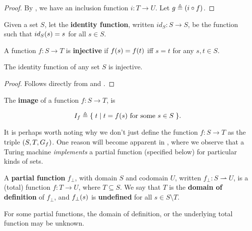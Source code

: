 \begin{proof} By , we have an inclusion function $i : T
\rightarrow U$. Let $g \triangleq {\ensuremath{\mathopen{}\left({i\circ f}\right)\mathclose{}}}$. \end{proof}

\begin{definition} \label{def:id-fun} Given a set $S$, let the \textbf{identity
function}, written $id_S: S \rightarrow S$, be the function such that
$id_S{\mathopen{}\left({s}\right)\mathclose{}}=s$ for all $s\in S$. \end{definition}

\begin{definition} \label{def:injective} A function $f : S \rightarrow T$ is
\textbf{injective} if $f{\mathopen{}\left({s}\right)\mathclose{}}=f{\mathopen{}\left({t}\right)\mathclose{}}$ iff $s=t$ for any $s,t\in S$.
\end{definition}

\begin{corollary} \label{cor:id-is-injective} The identity function of any set
$S$ is injective.  \end{corollary}

\begin{proof} Follows directly from  and .
\end{proof}

\begin{definition} \label{def:image} The \textbf{image} of a function $f : S
\rightarrow T$, is

$$I_f \triangleq \mathopen{}\left\{\mathrel{}{t\mathrel{}\mid\mathrel{}{\text{$t=f{\mathopen{}\left({s}\right)\mathclose{}}$ for some $s\in S$}}}\mathrel{}\right\}\mathclose{}.$$

\end{definition}

It is perhaps worth noting why we don't just define the function $f : S
\rightarrow T$ as the triple ${\mathopen{}\left({S, T, G_f}\right)\mathclose{}}$.  One reason will become apparent
in , where we observe that a Turing machine
\emph{implements} a partial function (specified below) for particular kinds of
sets.

\begin{specification} \label{spec:partial-function} A \textbf{partial function}
$f_\bot$, with domain $S$ and codomain $U$, written $f_\bot : S \rightharpoonup
U$, is a (total) function $f : T \rightarrow U$, where $T\subseteq S$. We say
that $T$ is the \textbf{domain of definition} of $f_\bot$, and $f_\bot{\ensuremath{\mathopen{}\left({s}\right)\mathclose{}}}$
is \textbf{undefined} for all $s \in S \setminus T$.\end{specification}

\begin{remark} For some partial functions, the domain of definition, or the
underlying total function may be unknown. \end{remark}

